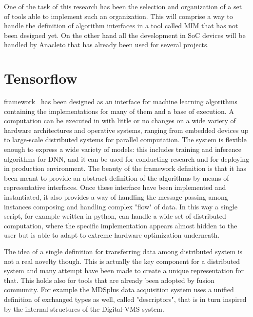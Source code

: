 One of the task of this research has been the selection and organization of a set of tools able to implement such an organization. This will comprise a way to handle the definition of algorithm interfaces in a tool called MIM that has not been designed yet. On the other hand all the development in SoC devices will be handled by Anacleto that has already been used for several projects.



%

\section{Tensorflow}

\Tensorflow framework~\cite{tensorflow2015-whitepaper} has been designed as an interface for machine learning algorithms containing the implementations for many of them and a base of execution. A computation can be executed in \Tensorflow with little or no changes on a wide variety of hardware architectures and operative systems, ranging from embedded devices up to large-scale distributed systems for parallel computation. The system is flexible enough to express a wide variety of models: this includes training and inference algorithms for \acs{DNN}, and it can be used for conducting research and for deploying in production environment. 
The beauty of the framework definition is that it has been meant to provide an abstract definition of the algorithms by means of representative interfaces. Once these interface have been implemented and instantiated, it also provides a way of handling the message passing among instances composing and handling complex "flow" of data. In this way a single script, for example written in python, can handle a wide set of distributed computation, where the specific implementation appears almost hidden to the user but is able to adapt to extreme hardware optimization underneath.

The idea of a single definition for transferring data among distributed system is not a real novelty though. This is actually the key component for a distributed system and many attempt have been made to create a unique representation for that. 
This holds also for tools that are already been adopted by fusion community. For example the MDSplus data acquisition system uses a unified definition of exchanged types as well, called "descriptors", that is in turn inspired by the internal structures of the Digital-VMS system.


